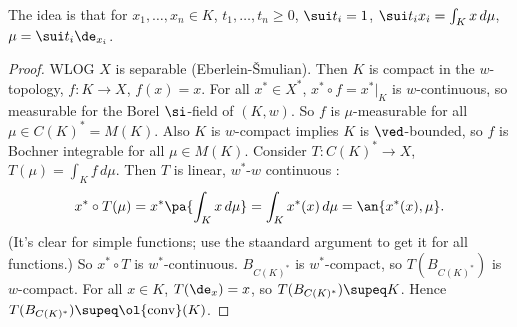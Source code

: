 The idea is that for $x_1,\ldots, x_n\in K$, $t_1,\ldots, t_n\ge 0$, $\sui t_i=1$, $\sui t_ix_i=\int_Kx\,d\mu$, $\mu=\sui t_i\de_{x_i}$. 

\begin{proof}
WLOG $X$ is separable (Eberlein-\v Smulian). Then $K$ is compact in the $w$-topology, $f:K\to X$, $f(x)=x$. For all $x^*\in X^*$, $x^*\circ f=x^*|_K$ is $w$-continuous, so measurable for the Borel $\si$-field of $(K,w)$. So $f$ is $\mu$-measurable for all $\mu\in C(K)^*=M(K)$. Also $K$ is $w$-compact implies $K$ is $\ved$-bounded, so $f$ is Bochner integrable for all $\mu\in M(K)$. Consider $T:C(K)^*\to X$, $T(\mu)=\int_K f\,d\mu$. Then $T$ is linear, $w^*$-$w$ continuous : 
\[
x^*\circ T(\mu)=x^*\pa{
\int_K x\,d\mu
}
=\int_K x^*(x)\,d\mu
=\an{x^*(x),\mu}.
\]
(It's clear for simple functions; use the staandard argument to get it for all functions.)
So $x^*\circ T$ is $w^*$-continuous. $B_{C(K)^*}$ is $w^*$-compact, so $T(B_{C(K)^*})$ is $w$-compact. For all $x\in K$, $T(\de_x)=x$, so $T(B_{C(K)^*})\supeq K$. Hence $T(B_{C(K)^*})\supeq \ol{\text{conv}}(K)$.
\end{proof}


